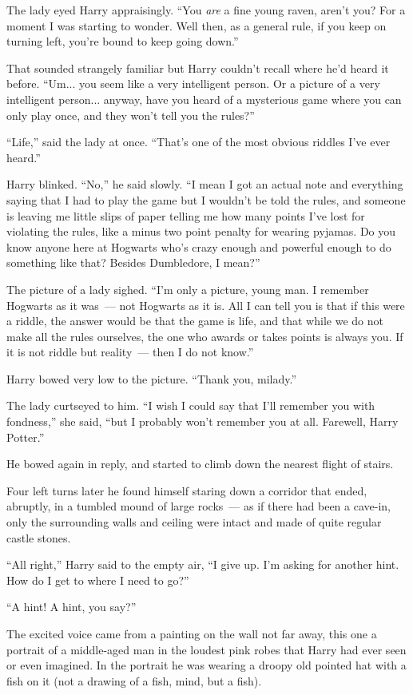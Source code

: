 The lady eyed Harry appraisingly. ``You \emph{are} a fine young raven, aren't you? For a moment I was starting to wonder. Well then, as a general rule, if you keep on turning left, you're bound to keep going down.''

That sounded strangely familiar but Harry couldn't recall where he'd heard it before. ``Um... you seem like a very intelligent person. Or a picture of a very intelligent person... anyway, have you heard of a mysterious game where you can only play once, and they won't tell you the rules?''

``Life,'' said the lady at once. ``That's one of the most obvious riddles I've ever heard.''

Harry blinked. ``No,'' he said slowly. ``I mean I got an actual note and everything saying that I had to play the game but I wouldn't be told the rules, and someone is leaving me little slips of paper telling me how many points I've lost for violating the rules, like a minus two point penalty for wearing pyjamas. Do you know anyone here at Hogwarts who's crazy enough and powerful enough to do something like that? Besides Dumbledore, I mean?''

The picture of a lady sighed. ``I'm only a picture, young man. I remember Hogwarts as it was~--- not Hogwarts as it is. All I can tell you is that if this were a riddle, the answer would be that the game is life, and that while we do not make all the rules ourselves, the one who awards or takes points is always you. If it is not riddle but reality~--- then I do not know.''

Harry bowed very low to the picture. ``Thank you, milady.''

The lady curtseyed to him. ``I wish I could say that I'll remember you with fondness,'' she said, ``but I probably won't remember you at all. Farewell, Harry Potter.''

He bowed again in reply, and started to climb down the nearest flight of stairs.

Four left turns later he found himself staring down a corridor that ended, abruptly, in a tumbled mound of large rocks~--- as if there had been a cave-in, only the surrounding walls and ceiling were intact and made of quite regular castle stones.

``All right,'' Harry said to the empty air, ``I give up. I'm asking for another hint. How do I get to where I need to go?''

``A hint! A hint, you say?''

The excited voice came from a painting on the wall not far away, this one a portrait of a middle-aged man in the loudest pink robes that Harry had ever seen or even imagined. In the portrait he was wearing a droopy old pointed hat with a fish on it (not a drawing of a fish, mind, but a fish).

